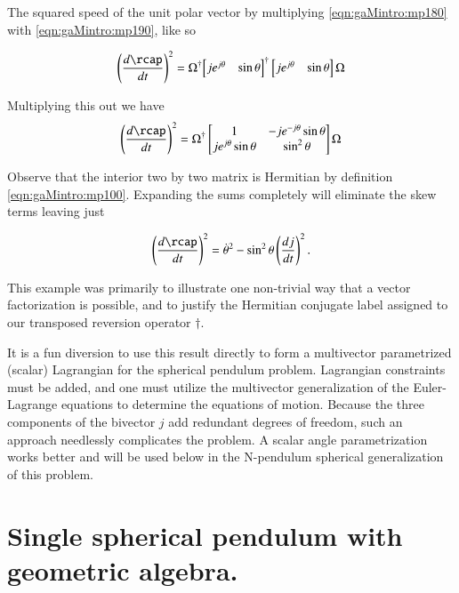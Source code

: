 The squared speed of the unit polar vector by multiplying \ref{eqn:gaMintro:mp180} with \ref{eqn:gaMintro:mp190}, like so

\begin{align}\label{eqn:gaMintro:mp200}
\left( \frac{d\rcap}{dt} \right)^2 =
\Omega^\dagger
{\begin{bmatrix}
j e^{j \theta} & \sin\theta
\end{bmatrix}}^\dagger
\begin{bmatrix}
j e^{j \theta} & \sin\theta
\end{bmatrix}
\Omega
\end{align}

Multiplying this out we have
\begin{align}\label{eqn:gaMintro:mp210}
\left( \frac{d\rcap}{dt} \right)^2 =
\Omega^\dagger
\begin{bmatrix}
1 & -j e^{-j\theta}\sin\theta \\
j e^{j\theta}\sin\theta  & \sin^2\theta
\end{bmatrix}
\Omega
\end{align}

Observe that the interior two by two matrix is Hermitian by definition \ref{eqn:gaMintro:mp100}.  Expanding the sums completely will eliminate the skew terms leaving just

\begin{align}\label{eqn:gaMintro:mp220}
\left( \frac{d\rcap}{dt} \right)^2 =
\dot{\theta}^2 - \sin^2 \theta \left(\frac{dj}{dt}\right)^2.
\end{align}

This example was primarily to illustrate one non-trivial way that a vector factorization is possible, and to justify the Hermitian conjugate label assigned to our transposed reversion operator $\dagger$.

It is a fun diversion to use this result directly to form a multivector parametrized (scalar) Lagrangian for the spherical pendulum problem.  Lagrangian constraints must be added, and one must utilize the multivector generalization of the Euler-Lagrange equations to determine the equations of motion.  Because the three components of the bivector $j$ add redundant degrees of freedom, such an approach needlessly complicates the problem.  A scalar angle parametrization works better and will be used below in the N-pendulum spherical generalization of this problem.

\section{Single spherical pendulum with geometric algebra.}

